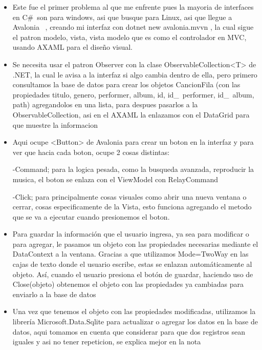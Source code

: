 \documentclass{article}
\begin{document}
\begin{itemize}
    \item Este fue el primer problema al que me enfrente pues la mayoria de interfaces en C\#\ son para  windows, asi que busque para Linux, asi que llegue a Avalonia ~\cite{avalonia}, creando mi interfaz con dotnet new avalonia.mvvn \cite{mvvm}, la cual sigue el patron modelo, vista, vista modelo que es como el controlador en MVC, usando AXAML para el diseño visual.
    
    \item Se necesita usar el patron Observer con la clase ObservableCollection<T> de .NET, la cual le avisa a la interfaz si algo cambia dentro de ella, pero primero consultamos la base de datos para crear los objetos CancionFila (con las propiedades titulo, genero, performer, album, id, id\_\ performer, id\_\ album, path) agregandolos en una lista, para despues pasarlos a la ObservableCollection, asi en el AXAML la enlazamos con el DataGrid para que muestre la informacion
    
    \item Aqui ocupe <Button> de Avalonia para crear un boton en la interfaz y para ver que hacia cada boton, ocupe 2 cosas distintas:
    
    -Command; para la logica pesada, como la busqueda avanzada, reproducir la musica, el boton se enlaza con el ViewModel con RelayCommand 

    -Click; para principalmente cosas visuales como abrir una nueva ventana o cerrar, cosas especificamente de la Vista, esto funciona agregando el metodo que se va a ejecutar cuando presionemos el boton.
    
    \item Para guardar la información que el usuario ingresa, ya sea para modificar o para agregar, le pasamos un objeto con las propiedades necesarias mediante el DataContext a la ventana. Gracias a que utilizamos Mode=TwoWay en las cajas de texto donde el usuario escribe, estas se enlazan automáticamente al objeto. Así, cuando el usuario presiona el botón de guardar, haciendo uso de Close(objeto) obtenemos el objeto con las propiedades ya cambiadas para enviarlo a la base de datos
    
    \item Una vez que tenemos el objeto con las propiedades modificadas, utilizamos la librería Microsoft.Data.Sqlite para actualizar o agregar los datos en la base de datos, aqui tomamos en cuenta que considerar para que dos registros sean iguales y asi no tener repeticion, se explica mejor en la nota
    

\end{itemize}
\end{document}
